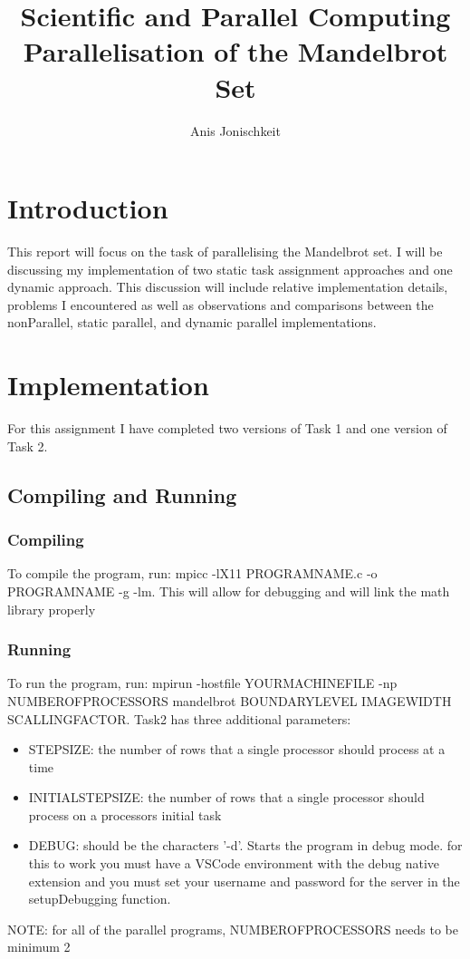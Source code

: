 \documentclass{article}
\begin{document}
\title{Scientific and Parallel Computing \\ Parallelisation of the Mandelbrot Set}
\author{Anis Jonischkeit}

\maketitle

\section{Introduction}
    This report will focus on the task of parallelising the Mandelbrot set. I will be discussing my implementation of
    two static task assignment approaches and one dynamic approach. This discussion will include relative implementation
    details, problems I encountered as well as observations and comparisons between the nonParallel, static parallel, and dynamic
    parallel implementations.

\section{Implementation}
    For this assignment I have completed two versions of Task 1 and one version of Task 2.

    \subsection{Compiling and Running}
        \subsubsection{Compiling}
        To compile the program, run: mpicc -lX11 PROGRAM\textunderscore NAME.c -o PROGRAM\textunderscore NAME -g -lm. This will allow for debugging and will link the math library properly
        \subsubsection{Running}
        To run the program, run: mpirun -hostfile YOUR\textunderscore MACHINE\textunderscore FILE -np NUMBER\textunderscore OF\textunderscore PROCESSORS mandelbrot BOUNDARY\textunderscore LEVEL IMAGE\textunderscore WIDTH SCALLING\textunderscore FACTOR. Task2 has three additional
        parameters:
        \renewcommand{\labelitemi}{$\textendash$}
        \begin{itemize}
            \item STEP\textunderscore SIZE: the number of rows that a single processor should process at a time
            \item INITIAL\textunderscore STEP\textunderscore SIZE: the number of rows that a single processor should process on a processors initial task
            \item DEBUG: should be the characters '-d'. Starts the program in debug mode. for this to work you must have a VSCode environment with the debug native extension and you must set your username and password for the server in the setupDebugging function.
        \end{itemize}
        \hfill \break
        NOTE: for all of the parallel programs, NUMBER\textunderscore OF\textunderscore PROCESSORS needs to be minimum 2
\end{document}
